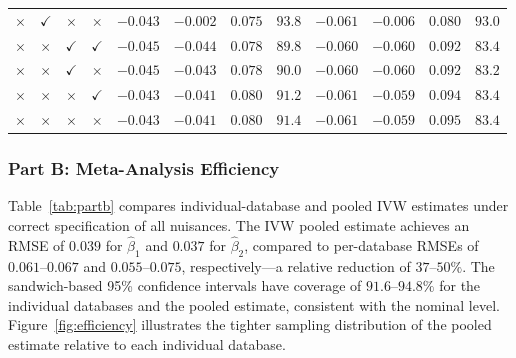 \begin{table}
{\begin{tabular}{cccc rrrr rrrr}
  $\times$     & $\checkmark$ & $\times$     & $\times$     & $-0.043$ & $-0.002$ & $0.075$ & $93.8$ & $-0.061$ & $-0.006$ & $0.080$ & $93.0$ \\
  $\times$     & $\times$     & $\checkmark$ & $\checkmark$ & $-0.045$ & $-0.044$ & $0.078$ & $89.8$ & $-0.060$ & $-0.060$ & $0.092$ & $83.4$ \\
  $\times$     & $\times$     & $\checkmark$ & $\times$     & $-0.045$ & $-0.043$ & $0.078$ & $90.0$ & $-0.060$ & $-0.060$ & $0.092$ & $83.2$ \\
  $\times$     & $\times$     & $\times$     & $\checkmark$ & $-0.043$ & $-0.041$ & $0.080$ & $91.2$ & $-0.061$ & $-0.059$ & $0.094$ & $83.4$ \\
  $\times$     & $\times$     & $\times$     & $\times$     & $-0.043$ & $-0.041$ & $0.080$ & $91.4$ & $-0.061$ & $-0.059$ & $0.095$ & $83.4$ \\
  \bottomrule
\end{tabular}}
\end{table}

\subsubsection*{Part B: Meta-Analysis Efficiency}

Table~\ref{tab:partb} compares individual-database and pooled IVW estimates
under correct specification of all nuisances.
The IVW pooled estimate achieves an RMSE of $0.039$ for $\hat\beta_1$
and $0.037$ for $\hat\beta_2$, compared to per-database RMSEs of
$0.061$--$0.067$ and $0.055$--$0.075$, respectively---a relative reduction
of $37$--$50\%$.
The sandwich-based 95\% confidence intervals have coverage of
$91.6$--$94.8\%$ for the individual databases and the pooled estimate,
consistent with the nominal level.
Figure~\ref{fig:efficiency} illustrates the tighter sampling distribution
of the pooled estimate relative to each individual database.

